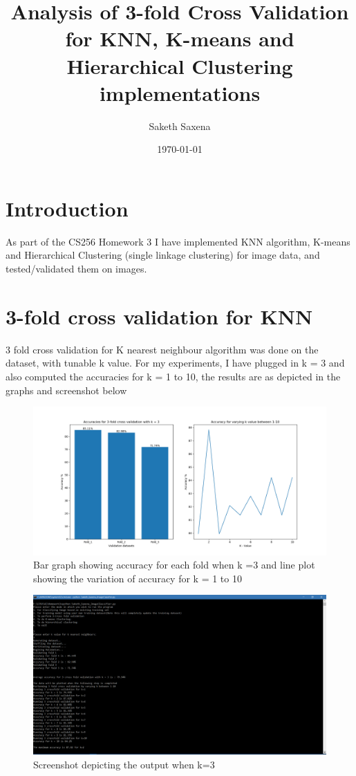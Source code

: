 \documentclass[a4paper]{article}
\title{Analysis of 3-fold Cross Validation for KNN, K-means and Hierarchical Clustering implementations}
\author{Saketh Saxena}
\date{\today}
\begin{document}
\maketitle

\section{Introduction}
\label{sec:introduction}
As part of the CS256 Homework 3 I have implemented KNN algorithm, K-means and Hierarchical Clustering (single linkage clustering) for image data, and tested/validated them on images.

\section{3-fold cross validation for KNN}
3 fold cross validation for K nearest neighbour algorithm was done on the dataset, with tunable k value. For my experiments, I have plugged in k = 3 and also computed the accuracies for k = 1 to 10, the results are as depicted in the graphs and screenshot below
\begin{figure}[H]
  \includegraphics[width=\linewidth]{knn_cross.png}
  \caption{ Bar graph showing accuracy for each fold when k =3 and line plot showing the variation of accuracy for k = 1 to 10 }
  \label{fig:Result 2}
\end{figure}
\begin{figure}[H]
  \includegraphics[width=\linewidth]{knn_screenshot_cross.PNG}
  \caption{ Screenshot depicting the output when k=3 }
  \label{fig:Result 3}
\end{figure}
\end{document}
